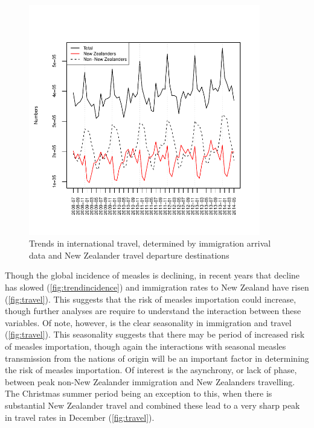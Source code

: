 \documentclass{article}
\begin{document}
\begin{figure}[H]
     \begin{center}
     \includegraphics[width=0.9\textwidth]{nzers.pdf}
     \end{center}
     \caption{Trends in international travel, determined by immigration arrival data and New Zealander travel departure destinations}
     \label{fig:travel}
\end{figure}

Though the global incidence of measles is declining, in recent years that decline has slowed (\autoref{fig:trendincidence}) and immigration rates to New Zealand have risen (\autoref{fig:travel}). This suggests that the risk of measles importation could increase, though further analyses are require to understand the interaction between these variables.  Of note, however, is the clear seasonality in immigration and travel (\autoref{fig:travel}).  This seasonality suggests that there may be period of increased risk of measles importation, though again the interactions with seasonal measles transmission from the nations of origin will be an important factor in determining the risk of measles importation. Of interest is the asynchrony, or lack of phase, between peak non-New Zealander immigration and New Zealanders travelling. The Christmas summer period being an exception to this, when there is substantial New Zealander travel and combined these lead to a very sharp peak in travel rates in December (\autoref{fig:travel}).
\end{document}
